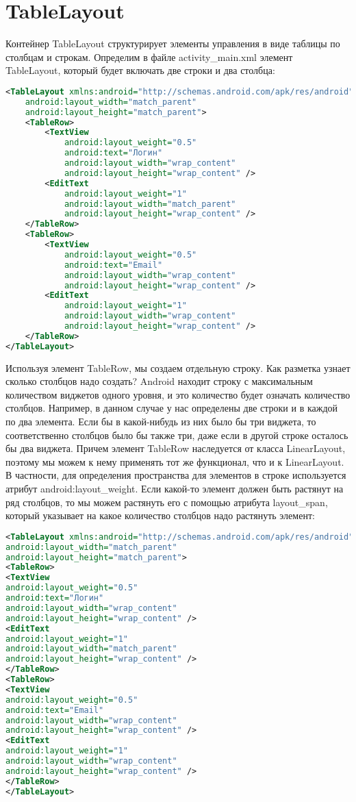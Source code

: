 \section{TableLayout}
Контейнер TableLayout структурирует элементы управления в виде таблицы
по столбцам и строкам.
Определим в файле activity\_main.xml элемент
TableLayout, который будет включать две строки и два столбца:
\begin{lstlisting}[language=xml, caption=\leftline{xml}, label=lst:TableLayout]
<TableLayout xmlns:android="http://schemas.android.com/apk/res/android"
    android:layout_width="match_parent"
    android:layout_height="match_parent">
    <TableRow>
        <TextView
            android:layout_weight="0.5"
            android:text="Логин"
            android:layout_width="wrap_content"
            android:layout_height="wrap_content" />
        <EditText
            android:layout_weight="1"
            android:layout_width="match_parent"
            android:layout_height="wrap_content" />
    </TableRow>
    <TableRow>
        <TextView
            android:layout_weight="0.5"
            android:text="Email"
            android:layout_width="wrap_content"
            android:layout_height="wrap_content" />
        <EditText
            android:layout_weight="1"
            android:layout_width="wrap_content"
            android:layout_height="wrap_content" />
    </TableRow>
</TableLayout>
\end{lstlisting}
Используя элемент TableRow, мы создаем отдельную строку. Как разметка
узнает сколько столбцов надо создать? Android находит строку с
максимальным количеством виджетов одного уровня, и это количество будет
означать количество столбцов. Например, в данном случае у нас определены
две строки и в каждой по два элемента. Если бы в какой-нибудь из них было
бы три виджета, то соответственно столбцов было бы также три, даже если в
другой строке осталось бы два виджета.
Причем элемент TableRow наследуется от класса LinearLayout, поэтому мы
можем к нему применять тот же функционал, что и к LinearLayout. В
частности, для определения пространства для элементов в строке
используется атрибут android:layout\_weight.
Если какой-то элемент должен быть растянут на ряд столбцов, то мы можем
растянуть его с помощью атрибута layout\_span, который указывает на какое
количество столбцов надо растянуть элемент:
\begin{lstlisting}[language=xml, caption=\leftline{xml}, label=lst:TableRow]
<TableLayout xmlns:android="http://schemas.android.com/apk/res/android"
android:layout_width="match_parent"
android:layout_height="match_parent">
<TableRow>
<TextView
android:layout_weight="0.5"
android:text="Логин"
android:layout_width="wrap_content"
android:layout_height="wrap_content" />
<EditText
android:layout_weight="1"
android:layout_width="match_parent"
android:layout_height="wrap_content" />
</TableRow>
<TableRow>
<TextView
android:layout_weight="0.5"
android:text="Email"
android:layout_width="wrap_content"
android:layout_height="wrap_content" />
<EditText
android:layout_weight="1"
android:layout_width="wrap_content"
android:layout_height="wrap_content" />
</TableRow>
</TableLayout>
\end{lstlisting}

